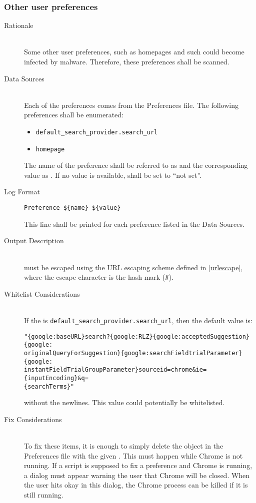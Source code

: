 \subsubsection{Other user preferences}
\begin{description}
\item[Rationale] \hfill \\
Some other user preferences, such as homepages and such could become infected by
malware.  Therefore, these preferences shall be scanned.
\item[Data Sources] \hfill \\
Each of the preferences comes from the Preferences file.  The following
preferences shall be enumerated:
\begin{itemize}
  \item \verb|default_search_provider.search_url|
  \item \verb|homepage|  
\end{itemize}
The name of the preference shall be referred to as  and the
corresponding value as .  If no value is available, 
shall be set to ``not set''.
\item[Log Format] \hfill 
\vspace{-\baselineskip}
\begin{verbatim}
Preference ${name} ${value}
\end{verbatim}
This line shall be printed for each preference listed in the Data Sources.
\item[Output Description] \hfill \\
 must be escaped using the URL escaping scheme defined in
\ref{urlescape}, where the escape character is the hash mark (\verb|#|).
\item[Whitelist Considerations] \hfill \\
If the  is \verb|default_search_provider.search_url|, then the default
value is:
\vspace{-\baselineskip}
\begin{verbatim}
"{google:baseURL}search?{google:RLZ}{google:acceptedSuggestion}{google:
originalQueryForSuggestion}{google:searchFieldtrialParameter}{google:
instantFieldTrialGroupParameter}sourceid=chrome&ie={inputEncoding}&q=
{searchTerms}"
\end{verbatim}
without the newlines.  This value could potentially be whitelisted.  
\item[Fix Considerations] \hfill \\
To fix these items, it is enough to simply delete the object in the Preferences
file with the given .  This must happen while Chrome is not running. 
If a script is supposed to fix a preference and Chrome is running, a dialog must
appear warning the user that Chrome will be closed.  When the user hits okay in
this dialog, the Chrome process can be killed if it is still running.
\end{description}

